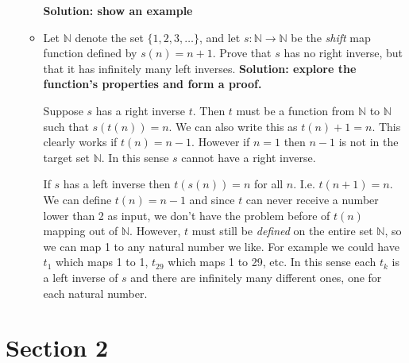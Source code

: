 \documentclass[main.tex]{subfiles}
\begin{document}
\begin{enumerate}
\begin{itemize}
        \textbf{Solution: show an example}
        
        \item Let $\mathbb{N}$ denote the set $\{1, 2, 3, \ldots\}$, and let $s: \mathbb{N} \to \mathbb{N}$ be the \textit{shift} map function defined by $s(n) = n + 1$. Prove that $s$ has no right inverse, but that it has infinitely many left inverses. 
        \textbf{Solution: explore the function's properties and form a proof.}

        Suppose $s$ has a right inverse $t$. Then $t$ must be a function from $\mathbb{N}$ to $\mathbb{N}$ such that $s(t(n)) = n$. We can also write this as $t(n) + 1 = n$. This clearly works if $t(n) = n - 1$. However if $n = 1$ then $n - 1$ is not in the target set $\mathbb{N}$. In this sense $s$ cannot have a right inverse. 

        If $s$ has a left inverse then $t(s(n)) = n$ for all $n$. I.e. $t(n + 1) = n$. We can define $t(n) = n - 1$ and since $t$ can never receive a number lower than 2 as input, we don't have the problem before of $t(n)$ mapping out of $\mathbb{N}$. However, $t$ must still be \textit{defined} on the entire set $\mathbb{N}$, so we can map 1 to any natural number we like. For example we could have $t_1$ which maps 1 to 1, $t_{29}$ which maps 1 to 29, etc. In this sense each $t_k$ is a left inverse of $s$ and there are infinitely many different ones, one for each natural number.
    \end{itemize}
\end{enumerate}

\section{Section 2}
\end{document}
